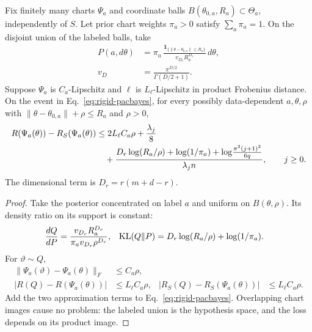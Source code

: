 \begin{theorem}
\label{thm:rigid-localized-pacbayes}
Fix finitely many charts $\Psi_a$ and coordinate balls
$B(\theta_{0,a},R_a)\subset\Theta_a$, independently of $S$.
Let prior chart weights $\pi_a>0$ satisfy $\sum_a\pi_a=1$.
On the disjoint union of the labeled balls, take
\begin{align}
P(a,d\theta)
&=\pi_a\,\frac{\mathbf1_{\{\|\theta-\theta_{0,a}\|\leq R_a\}}}
{v_{D_r}R_a^{D_r}}\,d\theta,\\
v_D&=\frac{\pi^{D/2}}{\Gamma(D/2+1)} .
\end{align}
Suppose $\Psi_a$ is $C_a$-Lipschitz and
$\ell$ is $L_\ell$-Lipschitz in product Frobenius distance.
On the event in Eq.~\eqref{eq:rigid-pacbayes}, for every possibly
data-dependent $a,\theta,\rho$ with
$\|\theta-\theta_{0,a}\|+\rho\leq R_a$ and $\rho>0$,
\begin{align}
R(\Psi_a(\theta))-R_S(\Psi_a(\theta))
&\leq 2L_\ell C_a\rho+\frac{\lambda_j}{8}\notag\\
&\quad+\frac{
D_r\log(R_a/\rho)+\log(1/\pi_a)
+\log\!\frac{\pi^2(j+1)^2}{6q}}
{\lambda_jn},
\qquad j\geq0 .
\label{eq:rigid-localized-pacbayes}
\end{align}
The dimensional term is $D_r=r(m+d-r)$.
\end{theorem}
\begin{proof}
Take the posterior concentrated on label $a$ and uniform on
$B(\theta,\rho)$. Its density ratio on its support is constant:
\begin{align}
\frac{dQ}{dP}
&=\frac{v_{D_r}R_a^{D_r}}
{\pi_a v_{D_r}\rho^{D_r}},&
{\rm KL}(Q\|P)
&=D_r\log(R_a/\rho)+\log(1/\pi_a).
\end{align}
For $\vartheta\sim Q$,
\begin{align}
\|\Psi_a(\vartheta)-\Psi_a(\theta)\|_F
&\leq C_a\rho,\\
|R(Q)-R(\Psi_a(\theta))|&\leq L_\ell C_a\rho,&
|R_S(Q)-R_S(\Psi_a(\theta))|&\leq L_\ell C_a\rho .
\end{align}
Add the two approximation terms to Eq.~\eqref{eq:rigid-pacbayes}.
Overlapping chart images cause no problem: the labeled union is the
hypothesis space, and the loss depends on its product image.
\end{proof}


